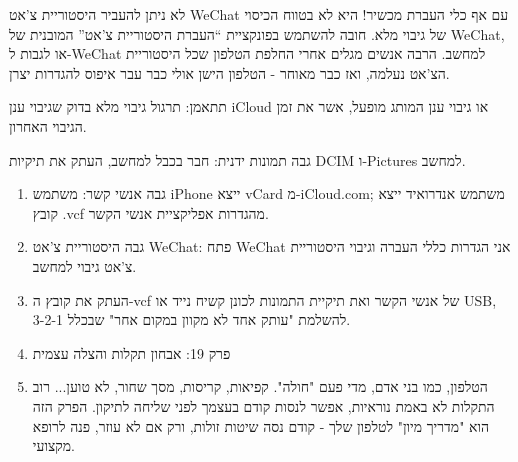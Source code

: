 לא ניתן להעביר היסטוריית צ'אט WeChat עם אף כלי העברת מכשיר! היא לא בטווח הכיסוי של גיבוי מלא. חובה להשתמש בפונקציית “העברת היסטוריית צ'אט” המובנית של WeChat, או לגבות ל-WeChat למחשב. הרבה אנשים מגלים אחרי החלפת הטלפון שכל היסטוריית הצ'אט נעלמה, ואז כבר מאוחר - הטלפון הישן אולי כבר עבר איפוס להגדרות יצרן.

\begin{tcbwarn}{תתאמן: תרגול גיבוי מלא}
בדוק שגיבוי ענן iCloud או גיבוי ענן המותג מופעל, אשר את זמן הגיבוי האחרון.

\end{tcbwarn}

\begin{tcbpractice}{גבה תמונות ידנית: חבר בכבל למחשב, העתק את תיקיות DCIM ו-Pictures למחשב.}
\begin{enumerate}
  \item גבה אנשי קשר: משתמש iPhone ייצא vCard מ-iCloud.com; משתמש אנדרואיד ייצא קובץ .vcf מהגדרות אפליקציית אנשי הקשר.
  \item גבה היסטוריית צ'אט WeChat: פתח WeChat אני הגדרות כללי העברה וגיבוי היסטוריית צ'אט גיבוי למחשב.
  \item העתק את קובץ ה-vcf של אנשי הקשר ואת תיקיית התמונות לכונן קשיח נייד או USB, להשלמת "עותק אחד לא מקוון במקום אחר" שבכלל 3-2-1.
  \item פרק 19: אבחון תקלות והצלה עצמית
  \item הטלפון, כמו בני אדם, מדי פעם "חולה". קפיאות, קריסות, מסך שחור, לא טוען... רוב התקלות לא באמת נוראיות, אפשר לנסות קודם בעצמך לפני שליחה לתיקון. הפרק הזה הוא "מדריך מיון" לטלפון שלך - קודם נסה שיטות זולות, ורק אם לא עוזר, פנה לרופא מקצועי.
\end{enumerate}

\end{tcbpractice}
